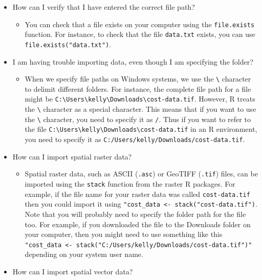 \documentclass[]{book}
\providecommand{\tightlist}{%
  \setlength{\itemsep}{0pt}\setlength{\parskip}{0pt}}
\begin{document}
\begin{itemize}
\item
  How can I verify that I have entered the correct file path?

  \begin{itemize}
  \tightlist
  \item
    You can check that a file exists on your computer using the
    \texttt{file.exists} function. For instance, to check that the file
    \texttt{data.txt} exists, you can use
    \texttt{file.exists("data.txt")}.
  \end{itemize}
\item
  I am having trouble importing data, even though I am specifying the
  folder?

  \begin{itemize}
  \tightlist
  \item
    When we specify file paths on Windows systems, we use the
    \texttt{\textbackslash{}} character to delimit different folders.
    For instance, the complete file path for a file might be
    \texttt{C:\textbackslash{}Users\textbackslash{}kelly\textbackslash{}Downloads\textbackslash{}cost-data.tif}.
    However, R treats the \texttt{\textbackslash{}} character as a
    special character. This means that if you want to use the
    \texttt{\textbackslash{}} character, you need to specify it as
    \texttt{/}. Thus if you want to refer to the file
    \texttt{C:\textbackslash{}Users\textbackslash{}kelly\textbackslash{}Downloads\textbackslash{}cost-data.tif}
    in an R environment, you need to specify it as
    \texttt{C:/Users/kelly/Downloads/cost-data.tif}.
  \end{itemize}
\item
  How can I import spatial raster data?

  \begin{itemize}
  \tightlist
  \item
    Spatial raster data, such as ASCII (\texttt{.asc}) or GeoTIFF
    (\texttt{.tif}) files, can be imported using the \texttt{stack}
    function from the raster R packages. For example, if the file name
    for your raster data was called \texttt{cost-data.tif} then you
    could import it using
    \texttt{"cost\_data\ \textless{}-\ stack("cost-data.tif")}. Note
    that you will probably need to specify the folder path for the file
    too. For example, if you downloaded the file to the Downloads folder
    on your computer, then you might need to use something like this
    \texttt{"cost\_data\ \textless{}-\ stack("C:/Users/kelly/Downloads/cost-data.tif")"}
    depending on your system user name.
  \end{itemize}
\item
  How can I import spatial vector data?


\end{itemize}
\end{document}
